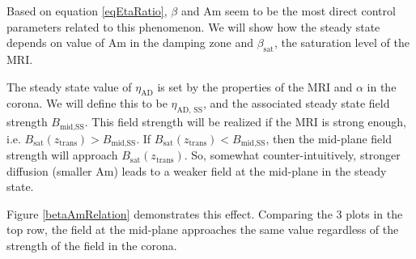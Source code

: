 
Based on equation \ref{eqEtaRatio}, $\beta$ and Am seem to be the most direct control parameters related to this phenomenon.  We will show how the steady state depends on value of Am in the damping zone and $\beta_{\text{sat}}$, the saturation level of the MRI.

The steady state value of $\eta_{\text{AD}}$ is set by the properties of the MRI and $\alpha$ in the corona.  We will define this to be $\eta_{\text{AD, SS}}$, and the associated steady state field strength $B_{\text{mid,SS}}$.  This field strength will be realized if the MRI is strong enough, i.e. $B_{\text{sat}}(z_\text{trans}) > B_{\text{mid,SS}}$.  If $B_{\text{sat}}(z_\text{trans}) < B_{\text{mid,SS}}$, then the mid-plane field strength will approach $B_{\text{sat}}(z_\text{trans})$.  So, somewhat counter-intuitively, stronger diffusion (smaller Am) leads to a weaker field at the mid-plane in the steady state.  

Figure \ref{betaAmRelation} demonstrates this effect.  Comparing the 3 plots in the top row, the field at the mid-plane approaches the same value regardless of the strength of the field in the corona.  



